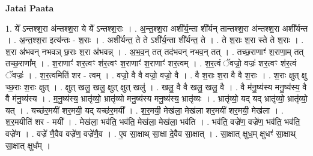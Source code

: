 \documentclass[17pt]{extarticle}
\begin{document}
\textbf{Jatai Paata} \newline

1. ये᳚ ऽन्तश्श॒रा अ॑न्तश्श॒रा ये ये᳚ ऽन्तश्श॒राः । . अ॒न्त॒श्श॒रा अशी᳚र्य॒न्ता शी᳚र्यन् तान्तश्श॒रा अ॑न्तश्श॒रा अशी᳚र्यन्त । . अ॒न्त॒श्श॒रा इत्य॑न्तः - श॒राः । . अशी᳚र्यन्त॒ ते ते ऽशी᳚र्य॒न्ता शी᳚र्यन्त॒ ते । . ते श॒राः श॒रा स्ते ते श॒राः । . श॒रा अ॑भवन् नभवञ् छ॒राः श॒रा अ॑भवन्न् । . अ॒भ॒व॒न् तत् तद॑भवन् नभव॒न् तत् । . तच्छ॒राणाꣳ॑ श॒राणा॒म् तत् तच्छ॒राणा᳚म् । . श॒राणाꣳ॑ शर॒त्वꣳ श॑र॒त्वꣳ श॒राणाꣳ॑ श॒राणाꣳ॑ शर॒त्वम् । . श॒र॒त्वं ॅवज्रो॒ वज्रः॑ शर॒त्वꣳ श॑र॒त्वं ॅवज्रः॑ । . श॒र॒त्वमिति॑ शर - त्वम् । . वज्रो॒ वै वै वज्रो॒ वज्रो॒ वै । . वै श॒राः श॒रा वै वै श॒राः । . श॒राः क्षुत् क्षु च्छ॒राः श॒राः क्षुत् । . क्षुत् खलु॒ खलु॒ क्षुत् क्षुत् खलु॑ । . खलु॒ वै वै खलु॒ खलु॒ वै । . वै म॑नु॒ष्य॑स्य मनु॒ष्य॑स्य॒ वै वै म॑नु॒ष्य॑स्य । . म॒नु॒ष्य॑स्य॒ भ्रातृ॑व्यो॒ भ्रातृ॑व्यो मनु॒ष्य॑स्य मनु॒ष्य॑स्य॒ भ्रातृ॑व्यः । . भ्रातृ॑व्यो॒ यद् यद् भ्रातृ॑व्यो॒ भ्रातृ॑व्यो॒ यत् । . यच्छ॑र॒मयी॑ शर॒मयी॒ यद् यच्छ॑र॒मयी᳚ । . श॒र॒मयी॒ मेख॑ला॒ मेख॑ला शर॒मयी॑ शर॒मयी॒ मेख॑ला । . श॒र॒मयीति॑ शर - मयी᳚ । . मेख॑ला॒ भव॑ति॒ भव॑ति॒ मेख॑ला॒ मेख॑ला॒ भव॑ति । . भव॑ति॒ वज्रे॑ण॒ वज्रे॑ण॒ भव॑ति॒ भव॑ति॒ वज्रे॑ण । . वज्रे॑ णै॒वैव वज्रे॑ण॒ वज्रे॑णै॒व । . ए॒व सा॒क्षाथ् सा॒क्षा दे॒वैव सा॒क्षात् । . सा॒क्षात् क्षुध॒म् क्षुधꣳ॑ सा॒क्षाथ् सा॒क्षात् क्षुध᳚म् । \newline
\end{document}
